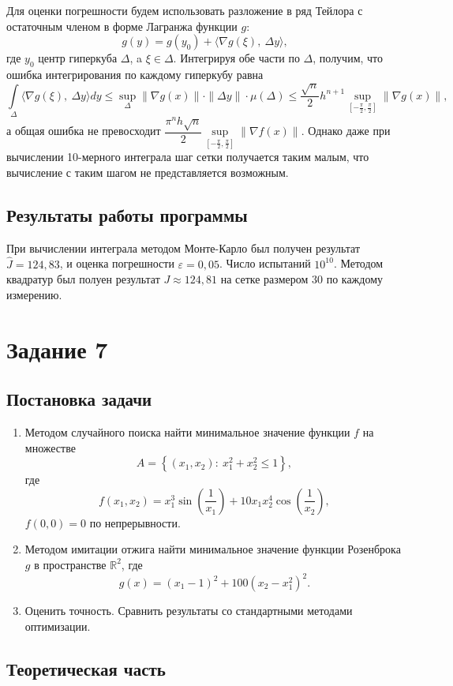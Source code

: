\documentclass[12pt, a4paper]{article} %
\renewcommand{\epsilon}{\varepsilon}
\begin{document}
Для оценки погрешности будем использовать разложение в ряд Тейлора с остаточным членом в форме Лагранжа функции $g$:
$$g(y) = g(y_0) + \langle \nabla g(\xi), \ \Delta y\rangle,$$
где $y_0$ центр гиперкуба $\Delta$, a $\xi \in \Delta$. Интегрируя обе части по $\Delta$, получим, что ошибка интегрирования по каждому гиперкубу равна
$$\int\limits_\Delta \langle \nabla g(\xi), \ \Delta y\rangle dy \leq \sup_\Delta \|\nabla g(x)\|\cdot\|\Delta y\|\cdot\mu(\Delta) \leq \dfrac{\sqrt{n}}{2}h^{n+1}\sup_{\left[-\frac{\pi}2, \frac{\pi}2\right]} \|\nabla g(x)\|,$$
а общая ошибка не превосходит $\dfrac{\pi^nh\sqrt{n}}{2}\sup\limits_{\left[-\frac{\pi}2, \frac{\pi}2\right]} \|\nabla f(x)\|$.
Однако даже при вычислении 10-мерного интеграла шаг сетки получается таким малым, что вычисление с таким шагом не представляется возможным.
\subsection{Результаты работы программы}

При вычислении интеграла методом Монте-Карло был получен результат $\hat{J} = 124{,}83$, и оценка погрешности $\epsilon = 0{,}05$. Число испытаний $10^{10}$.
Методом квадратур был полуен результат $J \approx 124{,}81$ на сетке размером 30 по каждому измерению.

\section{Задание 7}
\subsection{Постановка задачи}
\begin{enumerate}
	\item Методом случайного поиска найти минимальное значение функции $f$ на множестве $$A = \left\{(x_1, x_2)\colon \ x_1^2 + x_2^2 \leq 1\right\},$$ где 
 $$f(x_1, x_2) = x_1^3\sin\left(\dfrac{1}{x_1}\right) + 10x_1x_2^4 \cos\left(\dfrac{1}{x_2}\right),$$
 $f(0, 0) = 0$ по непрерывности.
	\item Методом имитации отжига найти минимальное значение функции Розенброка $g$ в пространстве $\mathbb{R}^2$, где
$$g(x) = (x_1 - 1)^2 + 100(x_2 - x_1^2)^2.$$
	\item Оценить точность. Сравнить результаты со стандартными методами оптимизации.
\end{enumerate}
\subsection{Теоретическая часть}
\end{document}
